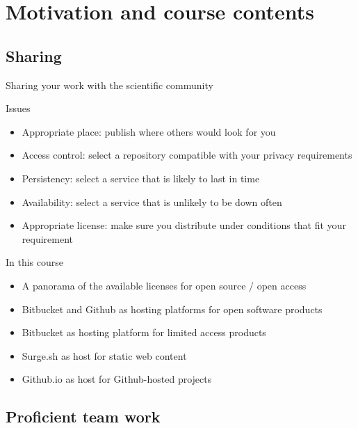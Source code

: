 \documentclass[presentation]{beamer}
\begin{document}
\section{Motivation and course contents}

\subsection{Sharing}

\begin{frame}{Sharing your work with the scientific community}
    \begin{block}{Issues}
        \begin{itemize}
            \item Appropriate place: publish where others would look for you
            \item Access control: select a repository compatible with your privacy requirements
            \item Persistency: select a service that is likely to last in time
            \item Availability: select a service that is unlikely to be down often
            \item Appropriate license: make sure you distribute under conditions that fit your requirement
        \end{itemize}
    \end{block}
    \begin{block}{In this course}
        \begin{itemize}
            \item A panorama of the available licenses for open source / open access
            \item Bitbucket and Github as hosting platforms for open software products
            \item Bitbucket as hosting platform for limited access products
            \item Surge.sh as host for static web content
            \item Github.io as host for Github-hosted projects
        \end{itemize}
    \end{block}
\end{frame}

\subsection{Proficient team work}
\end{document}
